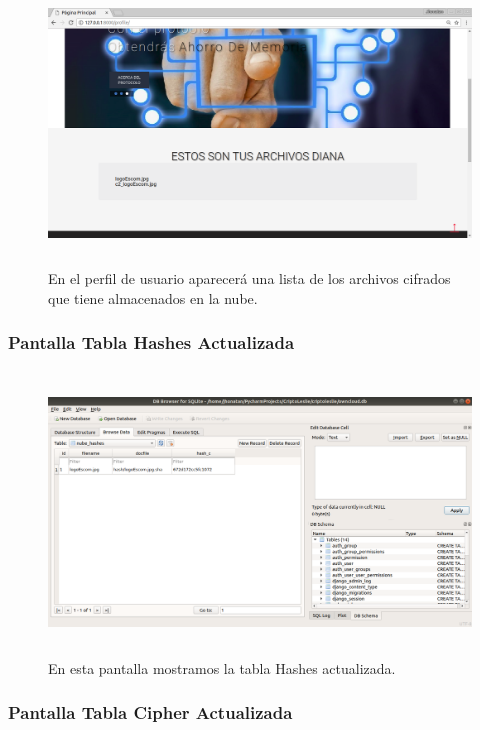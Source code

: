 			\begin{figure}[H]
			\centering
			\includegraphics[width=14cm, height=7.5cm]{./images/Implementacion/PantallaSubirArchivoNuevo2.png}
			\caption{En el perfil de usuario aparecerá una lista de los archivos cifrados que tiene almacenados en la nube.}
			\label{fig:6-1-13} 
			\end{figure}

\subsubsection{Pantalla Tabla Hashes Actualizada}

			\begin{figure}[H]
			\centering
			\includegraphics[width=14cm, height=7.5cm]{./images/Implementacion/BDSubirArchivoNuevo1.png}
			\caption{En esta pantalla mostramos la tabla Hashes actualizada.}
			\label{fig:6-1-14} 
			\end{figure}

\subsubsection{Pantalla Tabla Cipher Actualizada}

